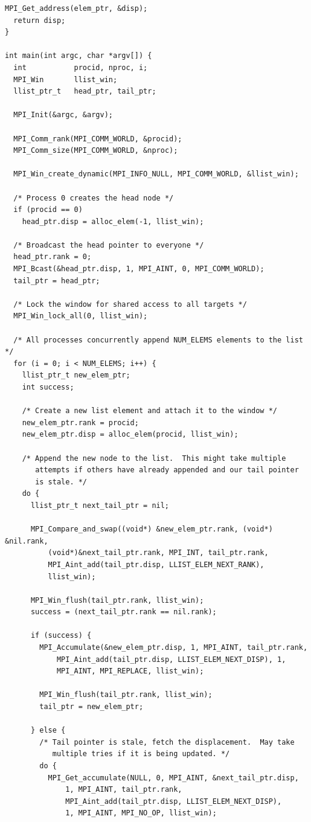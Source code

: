 \begin{example}
\begin{lstlisting}[language={[MPI]C},basicstyle=\lstsmall]
  MPI_Get_address(elem_ptr, &disp);
  return disp;
}

int main(int argc, char *argv[]) {
  int           procid, nproc, i;
  MPI_Win       llist_win;
  llist_ptr_t   head_ptr, tail_ptr;

  MPI_Init(&argc, &argv);

  MPI_Comm_rank(MPI_COMM_WORLD, &procid);
  MPI_Comm_size(MPI_COMM_WORLD, &nproc);

  MPI_Win_create_dynamic(MPI_INFO_NULL, MPI_COMM_WORLD, &llist_win);

  /* Process 0 creates the head node */
  if (procid == 0)
    head_ptr.disp = alloc_elem(-1, llist_win);

  /* Broadcast the head pointer to everyone */
  head_ptr.rank = 0;
  MPI_Bcast(&head_ptr.disp, 1, MPI_AINT, 0, MPI_COMM_WORLD);
  tail_ptr = head_ptr;

  /* Lock the window for shared access to all targets */
  MPI_Win_lock_all(0, llist_win);

  /* All processes concurrently append NUM_ELEMS elements to the list */
  for (i = 0; i < NUM_ELEMS; i++) {
    llist_ptr_t new_elem_ptr;
    int success;

    /* Create a new list element and attach it to the window */
    new_elem_ptr.rank = procid;
    new_elem_ptr.disp = alloc_elem(procid, llist_win);

    /* Append the new node to the list.  This might take multiple 
       attempts if others have already appended and our tail pointer 
       is stale. */
    do {
      llist_ptr_t next_tail_ptr = nil;

      MPI_Compare_and_swap((void*) &new_elem_ptr.rank, (void*) &nil.rank,
          (void*)&next_tail_ptr.rank, MPI_INT, tail_ptr.rank,
          MPI_Aint_add(tail_ptr.disp, LLIST_ELEM_NEXT_RANK),
          llist_win);

      MPI_Win_flush(tail_ptr.rank, llist_win);
      success = (next_tail_ptr.rank == nil.rank);

      if (success) {
        MPI_Accumulate(&new_elem_ptr.disp, 1, MPI_AINT, tail_ptr.rank,
            MPI_Aint_add(tail_ptr.disp, LLIST_ELEM_NEXT_DISP), 1,
            MPI_AINT, MPI_REPLACE, llist_win);

        MPI_Win_flush(tail_ptr.rank, llist_win);
        tail_ptr = new_elem_ptr;

      } else {
        /* Tail pointer is stale, fetch the displacement.  May take
           multiple tries if it is being updated. */
        do {
          MPI_Get_accumulate(NULL, 0, MPI_AINT, &next_tail_ptr.disp,
              1, MPI_AINT, tail_ptr.rank,
              MPI_Aint_add(tail_ptr.disp, LLIST_ELEM_NEXT_DISP),
              1, MPI_AINT, MPI_NO_OP, llist_win);


\end{lstlisting}
\end{example}
